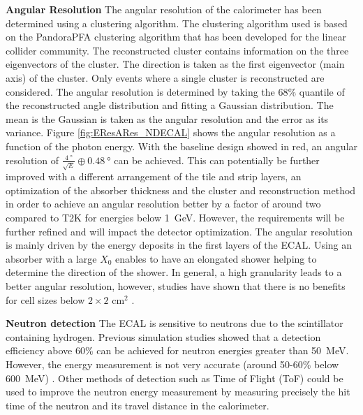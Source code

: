 \textbf{Angular Resolution} The angular resolution of the calorimeter has been determined using a clustering algorithm. The clustering algorithm used is based on the PandoraPFA \cite{Thomson:2009rp} clustering algorithm that has been developed for the linear collider community. The reconstructed cluster contains information on the three eigenvectors of the cluster. The direction is taken as the first eigenvector (main axis) of the cluster. Only events where a single cluster is reconstructed are considered. The angular resolution is determined by taking the 68\% quantile of the reconstructed angle distribution and fitting a Gaussian distribution. The mean is the Gaussian is taken as the angular resolution and the error as its variance. Figure \ref{fig:EResARes_NDECAL} shows the angular resolution as a function of the photon energy. With the baseline design showed in red, an angular resolution of $\frac{\SI{4}{\degree}}{\sqrt{E}} \oplus \SI{0.48}{\degree}$ can be achieved. This can potentially be further improved with a different arrangement of the tile and strip layers, an optimization of the absorber thickness and the cluster and reconstruction method in order to achieve an angular resolution better by a factor of around two compared to T2K \cite{Abe:2011ks, Guzowski:2011duw} for energies below \SI{1}{\GeV}. However, the requirements will be further refined and will impact the detector optimization. The angular resolution is mainly driven by the energy deposits in the first layers of the ECAL. Using an absorber with a large $X_{0}$ enables to have an elongated shower helping to determine the direction of the shower. In general, a high granularity leads to a better angular resolution, however, studies have shown that there is no benefits for cell sizes below $2\times2$ cm$^2$ \cite{Emberger:2018pgr}.

\textbf{Neutron detection} The ECAL is sensitive to neutrons due to the scintillator containing hydrogen. Previous simulation studies showed that a detection efficiency above 60\% can be achieved for neutron energies greater than \SI{50}{\MeV}. However, the energy measurement is not very accurate (around 50-60\% below \SI{600}{\MeV}) \cite{Emberger:2018pgr}. Other methods of detection such as Time of Flight (ToF) could be used to improve the neutron energy measurement by measuring precisely the hit time of the neutron and its travel distance in the calorimeter.

